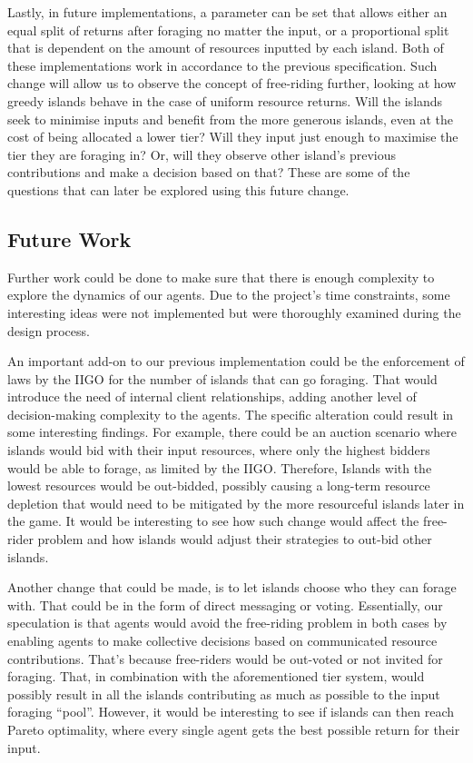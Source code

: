 Lastly, in future implementations, a parameter can be set that allows either an equal split of returns after foraging no matter the input, or a proportional split that is dependent on the amount of resources inputted by each island. Both of these implementations work in accordance to the previous specification. Such change will allow us to observe the concept of free-riding further, looking at how greedy islands behave in the case of uniform resource returns. Will the islands seek to minimise inputs and benefit from the more generous islands, even at the cost of being allocated a lower tier? Will they input just enough to maximise the tier they are foraging in? Or, will they observe other island’s previous contributions and make a decision based on that? These are some of the questions that can later be explored using this future change.

\subsection{Future Work}

Further work could be done to make sure that there is enough complexity to explore the dynamics of our agents. Due to the project’s time constraints, some interesting ideas were not implemented but were thoroughly examined during the design process.

An important add-on to our previous implementation could be the enforcement of laws by the IIGO for the number of islands that can go foraging. That would introduce the need of internal client relationships, adding another level of decision-making complexity to the agents. The specific alteration could result in some interesting findings. For example, there could be an auction scenario where islands would bid with their input resources, where only the highest bidders would be able to forage, as limited by the IIGO. Therefore, Islands with the lowest resources would be out-bidded, possibly causing a long-term resource depletion that would need to be mitigated by the more resourceful islands later in the game. It would be interesting to see how such change would affect the free-rider problem and how islands would adjust their strategies to out-bid other islands.

Another change that could be made, is to let islands choose who they can forage with. That could be in the form of direct messaging or voting. Essentially, our speculation is that agents would avoid the free-riding problem in both cases by enabling agents to make collective decisions based on communicated resource contributions. That’s because free-riders would be out-voted or not invited for foraging. That, in combination with the aforementioned tier system, would possibly result in all the islands contributing as much as possible to the input foraging “pool”.  However, it would be interesting to see if islands can then reach Pareto optimality, where every single agent gets the best possible return for their input.

